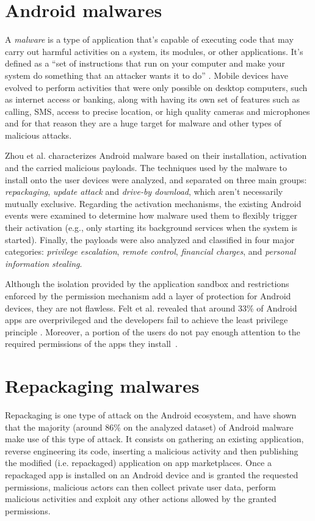 \section{Android malwares}

A \textit{malware} is a type of application that's capable of executing code that may carry out harmful activities on a system, its modules, or other applications. It's defined as a ``set of instructions that run on your computer and make your system do something that an attacker wants it to do'' \cite{skoudis_malware_2003}. Mobile devices have evolved to perform activities that were only possible on desktop computers, such as internet access or banking, along with having its own set of features such as calling, SMS, access to precise location, or high quality cameras and microphones and for that reason they are a huge target for malware and other types of malicious attacks.

Zhou et al. \cite{zhou_dissecting_2012} characterizes Android malware based on their installation, activation and the carried malicious payloads. The techniques used by the malware to install onto the user devices were analyzed, and separated on three main groups: \textit{repackaging}, \textit{update attack} and \textit{drive-by download}, which aren't necessarily mutually exclusive. Regarding the activation mechanisms, the existing Android events were examined to determine how malware used them to flexibly trigger their activation (e.g., only starting its background services when the system is started). Finally, the payloads were also analyzed and classified in four major categories: \textit{privilege escalation}, \textit{remote control}, \textit{financial
charges}, and \textit{personal information stealing}.

Although the isolation provided by the application sandbox and restrictions enforced by the permission mechanism add a layer of protection for Android devices, they are not flawless. Felt et al. revealed that around 33\% of Android apps are overprivileged and the developers fail to achieve the least privilege principle \cite{felt_android_2011}. Moreover, a portion of the users do not pay enough attention to the required permissions of the apps they install~\cite{felt_android_2012}.

\section{Repackaging malwares}

Repackaging is one type of attack on the Android ecosystem, and \cite{zhou_dissecting_2012} have shown that the majority (around 86\% on the analyzed dataset) of Android malware make use of this type of attack. It consists on gathering an existing application, reverse engineering its code, inserting a malicious activity and then publishing the modified (i.e. repackaged) application on app marketplaces. Once a repackaged app is installed on an Android device and is granted the requested permissions, malicious actors can then collect private user data, perform malicious activities and exploit any other actions allowed by the granted permissions. 


